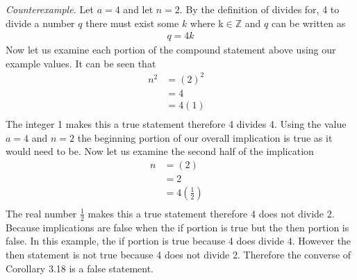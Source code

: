 \documentclass{article}
\begin{document}
\textit{Counterexample.} Let $a=4$ and let $n=2$. By the definition of divides for, 4 to divide a number $q$ there must exist some $k$ where k$\in \mathbb{Z}$ and $q$ can be written as
\begin{align*}
    q = 4k
\end{align*}
Now let us examine each portion of the compound statement above using our example values. It can be seen that
\begin{align*}
    n^2 & = (2)^2\\
    & = 4 \\
    &= 4(1) &\text{}\\
\end{align*}
The integer 1 makes this a true statement therefore 4 divides 4. Using the value $a = 4$ and $n = 2$ the beginning portion of our overall implication is true as it would need to be. Now let us examine the second half of the implication 
\begin{align*}
    n &= (2)\\
     &= 2&\\
     &= 4(\frac{1}{2}) &\text{} \\
\end{align*}
The real number $\frac{1}{2}$ makes this a true statement therefore 4 does not divide 2. Because implications are false when the if portion is true but the then portion is false. In this example, the if portion is true because 4 does divide 4. However the then statement is not true because 4 does not divide 2. Therefore the converse of Corollary 3.18 is a false statement.
\end{document}
